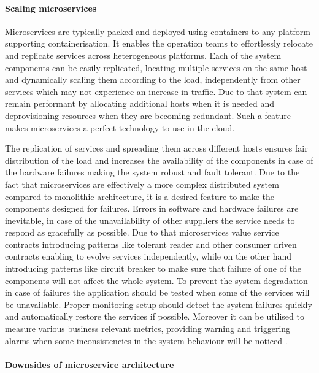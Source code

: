 \paragraph{Scaling microservices}

Microservices are typically packed and deployed using containers to any platform supporting containerisation. It enables the operation teams to effortlessly relocate and replicate services across heterogeneous platforms. Each of the system components can be easily replicated, locating multiple services on the same host and dynamically scaling them according to the load, independently from other services which may not experience an increase in traffic. Due to that system can remain performant by allocating additional hosts when it is needed and deprovisioning resources when they are becoming redundant. Such a feature makes microservices a perfect technology to use in the cloud.

The replication of services and spreading them across different hosts ensures fair distribution of the load and increases the availability of the components in case of the hardware failures making the system robust and fault tolerant. Due to the fact that microservices are effectively a more complex distributed system compared to monolithic architecture, it is a desired feature to make the components designed for failures. Errors in software and hardware failures are inevitable, in case of the unavailability of other suppliers the service needs to respond as gracefully as possible. Due to that microservices value service contracts introducing patterns like tolerant reader and other consumer driven contracts enabling to evolve services independently, while on the other hand introducing patterns like circuit breaker to make sure that failure of one of the components will not affect the whole system. To prevent the system degradation in case of failures the application should be tested when some of the services will be unavailable. Proper monitoring setup should detect the system failures quickly and automatically restore the services if possible. Moreover it can be utilised to measure various business relevant metrics, providing warning and triggering alarms when some inconsistencies in the system behaviour will be noticed \cite{MicroservicesHowToMakeYourApplicationScale}.

\paragraph{Downsides of microservice architecture}

